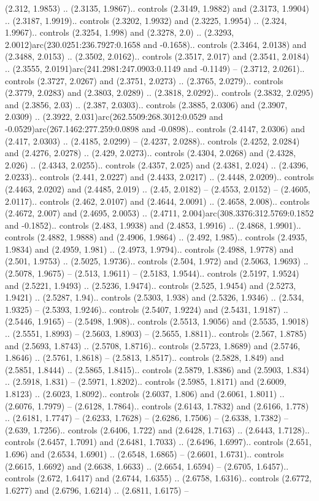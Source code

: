 (2.312, 1.9853) .. (2.3135, 1.9867).. controls (2.3149, 1.9882) and (2.3173, 1.9904) .. (2.3187, 1.9919).. controls (2.3202, 1.9932) and (2.3225, 1.9954) .. (2.324, 1.9967).. controls (2.3254, 1.998) and (2.3278, 2.0) .. (2.3293, 2.0012)arc(230.0251:236.7927:0.1658 and -0.1658).. controls (2.3464, 2.0138) and (2.3488, 2.0153) .. (2.3502, 2.0162).. controls (2.3517, 2.017) and (2.3541, 2.0184) .. (2.3555, 2.0191)arc(241.2981:247.0903:0.1149 and -0.1149) -- (2.3712, 2.0261).. controls (2.3727, 2.0267) and (2.3751, 2.0273) .. (2.3765, 2.0279).. controls (2.3779, 2.0283) and (2.3803, 2.0289) .. (2.3818, 2.0292).. controls (2.3832, 2.0295) and (2.3856, 2.03) .. (2.387, 2.0303).. controls (2.3885, 2.0306) and (2.3907, 2.0309) .. (2.3922, 2.031)arc(262.5509:268.3012:0.0529 and -0.0529)arc(267.1462:277.259:0.0898 and -0.0898).. controls (2.4147, 2.0306) and (2.417, 2.0303) .. (2.4185, 2.0299) -- (2.4237, 2.0288).. controls (2.4252, 2.0284) and (2.4276, 2.0278) .. (2.429, 2.0273).. controls (2.4304, 2.0268) and (2.4328, 2.026) .. (2.4343, 2.0255).. controls (2.4357, 2.025) and (2.4381, 2.024) .. (2.4396, 2.0233).. controls (2.441, 2.0227) and (2.4433, 2.0217) .. (2.4448, 2.0209).. controls (2.4463, 2.0202) and (2.4485, 2.019) .. (2.45, 2.0182) -- (2.4553, 2.0152) -- (2.4605, 2.0117).. controls (2.462, 2.0107) and (2.4644, 2.0091) .. (2.4658, 2.008).. controls (2.4672, 2.007) and (2.4695, 2.0053) .. (2.4711, 2.004)arc(308.3376:312.5769:0.1852 and -0.1852).. controls (2.483, 1.9938) and (2.4853, 1.9916) .. (2.4868, 1.9901).. controls (2.4882, 1.9888) and (2.4906, 1.9864) .. (2.492, 1.985).. controls (2.4935, 1.9834) and (2.4959, 1.981) .. (2.4973, 1.9794).. controls (2.4988, 1.9778) and (2.501, 1.9753) .. (2.5025, 1.9736).. controls (2.504, 1.972) and (2.5063, 1.9693) .. (2.5078, 1.9675) -- (2.513, 1.9611) -- (2.5183, 1.9544).. controls (2.5197, 1.9524) and (2.5221, 1.9493) .. (2.5236, 1.9474).. controls (2.525, 1.9454) and (2.5273, 1.9421) .. (2.5287, 1.94).. controls (2.5303, 1.938) and (2.5326, 1.9346) .. (2.534, 1.9325) -- (2.5393, 1.9246).. controls (2.5407, 1.9224) and (2.5431, 1.9187) .. (2.5446, 1.9165) -- (2.5498, 1.908).. controls (2.5513, 1.9056) and (2.5535, 1.9018) .. (2.5551, 1.8993) -- (2.5603, 1.8903) -- (2.5655, 1.8811).. controls (2.567, 1.8785) and (2.5693, 1.8743) .. (2.5708, 1.8716).. controls (2.5723, 1.8689) and (2.5746, 1.8646) .. (2.5761, 1.8618) -- (2.5813, 1.8517).. controls (2.5828, 1.849) and (2.5851, 1.8444) .. (2.5865, 1.8415).. controls (2.5879, 1.8386) and (2.5903, 1.834) .. (2.5918, 1.831) -- (2.5971, 1.8202).. controls (2.5985, 1.8171) and (2.6009, 1.8123) .. (2.6023, 1.8092).. controls (2.6037, 1.806) and (2.6061, 1.8011) .. (2.6076, 1.7979) -- (2.6128, 1.7864).. controls (2.6143, 1.7832) and (2.6166, 1.778) .. (2.6181, 1.7747) -- (2.6233, 1.7628) -- (2.6286, 1.7506) -- (2.6338, 1.7382) -- (2.639, 1.7256).. controls (2.6406, 1.722) and (2.6428, 1.7163) .. (2.6443, 1.7128).. controls (2.6457, 1.7091) and (2.6481, 1.7033) .. (2.6496, 1.6997).. controls (2.651, 1.696) and (2.6534, 1.6901) .. (2.6548, 1.6865) -- (2.6601, 1.6731).. controls (2.6615, 1.6692) and (2.6638, 1.6633) .. (2.6654, 1.6594) -- (2.6705, 1.6457).. controls (2.672, 1.6417) and (2.6744, 1.6355) .. (2.6758, 1.6316).. controls (2.6772, 1.6277) and (2.6796, 1.6214) .. (2.6811, 1.6175) -- 